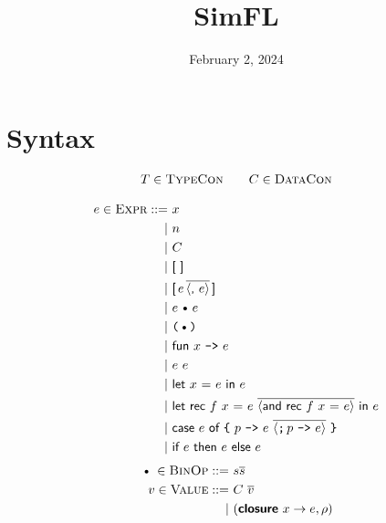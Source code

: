 \documentclass{article}
\title{SimFL}
\date{February 2, 2024}
\def\code#1{\textsf{#1}}
\def\por{\ | \ }
\def\binop{\, \text{\textbullet}\, }
\def\closure#1#2#3{(\textsf{\textbf{closure}} \ #1 \to #2,#3)}
\begin{document}
\maketitle
\section*{Syntax}

\begin{gather*}
 T \in \textsc{TypeCon}\qquad C \in \textsc{DataCon}
\end{gather*}

\begin{align*}
e \in \textsc{Expr} ::= \ & x \\
\por & n \\
\por & C \\
\por & \code{[ ]}\\
\por & \code{[}\,e\,\overline{\langle \code{,}\ e\rangle}\,\code{]}\\
\por & e \binop e\\
\por & \texttt{($\binop$)}\\
\por & \code{fun $x$ \texttt{->} $e$}\\
\por & e \ e\\
\por & \code{let $x$ = $e$ in $e$}\\
\por & \code{let rec $f$ $x$ = $e$ }\overline{\langle\code{and rec $f$ $x$ = $e$}\rangle}\code{ in $e$}\\
\por & \code{case $e$ of }\texttt{\char`\{} \ \code{$p$ \texttt{->} $e$}\ \overline{\langle \texttt{;} \, \code{$p$ \texttt{->} $e$}\rangle} \ \texttt{\char`\}}\\
\por & \code{if $e$ then $e$ else $e$}\\
%
%
\end{align*}
\begin{align*}
\binop \in \textsc{BinOp} ::= \ & s\overline{s}\\
v\in \textsc{Value}::=\ & C \ \overline{v} \\
\por & \closure x e \rho
\end{align*}
\pagebreak
\end{document}
